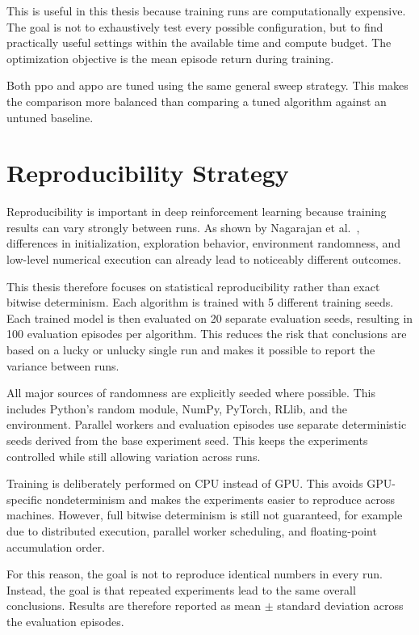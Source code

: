 \documentclass[english,bachelor]{hsluthesis}
\begin{document}
This is useful in this thesis because training runs are computationally expensive. The goal is not to exhaustively test every possible configuration, but to find practically useful settings within the available time and compute budget. The optimization objective is the mean episode return during training.

Both \gls{ppo} and \gls{appo} are tuned using the same general sweep strategy. This makes the comparison more balanced than comparing a tuned algorithm against an untuned baseline.

\section{Reproducibility Strategy}

Reproducibility is important in deep reinforcement learning because training results can vary strongly between runs. As shown by Nagarajan et al.~\cite{Nagarajan2018TheIO}, differences in initialization, exploration behavior, environment randomness, and low-level numerical execution can already lead to noticeably different outcomes.

This thesis therefore focuses on statistical reproducibility rather than exact bitwise determinism. Each algorithm is trained with 5 different training seeds. Each trained model is then evaluated on 20 separate evaluation seeds, resulting in 100 evaluation episodes per algorithm. This reduces the risk that conclusions are based on a lucky or unlucky single run and makes it possible to report the variance between runs.

All major sources of randomness are explicitly seeded where possible. This includes Python's random module, NumPy, PyTorch, RLlib, and the environment. Parallel workers and evaluation episodes use separate deterministic seeds derived from the base experiment seed. This keeps the experiments controlled while still allowing variation across runs.

Training is deliberately performed on CPU instead of GPU. This avoids GPU-specific nondeterminism and makes the experiments easier to reproduce across machines. However, full bitwise determinism is still not guaranteed, for example due to distributed execution, parallel worker scheduling, and floating-point accumulation order.

For this reason, the goal is not to reproduce identical numbers in every run. Instead, the goal is that repeated experiments lead to the same overall conclusions. Results are therefore reported as mean $\pm$ standard deviation across the evaluation episodes.
\end{document}

